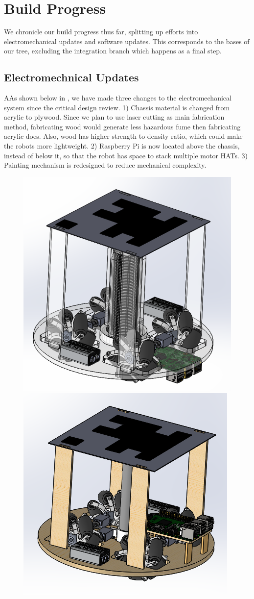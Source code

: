 
\section{Build Progress}
\label{sec:build_progress}

We chronicle our build progress thus far, splitting up efforts into electromechanical updates and software updates. This corresponds to the bases of our tree, excluding the integration branch which happens as a final step.

\subsection{Electromechnical Updates}
\label{sec:electromechanical_progress}

AAs shown below in , we have made three changes to the electromechanical system since the critical design review. 1) Chassis material is changed from acrylic to plywood. Since we plan to use laser cutting as main fabrication method, fabricating wood would generate less hazardous fume then fabricating acrylic does. Also, wood has higher strength to density ratio, which could make the robots more lightweight. 2) Raspberry Pi is now located above the chassis, instead of below it, so that the robot has space to stack multiple motor HATs. 3) Painting mechanism is redesigned to reduce mechanical complexity.

\begin{figure}[h!]
\centering
\includegraphics[width=0.49\columnwidth]{CAD/full_old.PNG}
\includegraphics[width=0.49\columnwidth]{CAD/full_new.PNG}
\label{fig:em1}
\end{figure}

